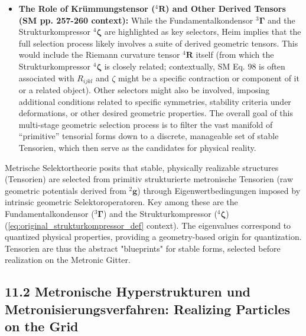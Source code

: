 \documentclass[12pt]{article}
\newcommand{\q}[1]{\enquote{#1}}
\newcommand{\kompositionsfeld}{{}^2\mathbf{g}}
\newcommand{\fundamentalkondensor}{{}^3\bm{\Gamma}}
\newcommand{\strukturkompressor}{{}^4\bm{\zeta}}
\begin{document}
\begin{itemize}
    \item \textbf{The Role of Krümmungstensor (\( {}^4\mathbf{R} \)) and Other Derived Tensors (SM pp. 257-260 context):}
    While the Fundamentalkondensor \( \fundamentalkondensor \) and the Strukturkompressor \( \strukturkompressor \) are highlighted as key selectors, Heim implies that the full selection process likely involves a suite of derived geometric tensors. This would include the Riemann curvature tensor \( {}^4\mathbf{R} \) itself (from which the Strukturkompressor \( \strukturkompressor \) is closely related; contextually, SM Eq. 98 is often associated with \(R_{ijkl}\) and \( \zeta \) might be a specific contraction or component of it or a related object). Other selectors might also be involved, imposing additional conditions related to specific symmetries, stability criteria under deformations, or other desired geometric properties. The overall goal of this multi-stage geometric selection process is to filter the vast manifold of \q{primitive} tensorial forms down to a discrete, manageable set of stable Tensorien, which then serve as the candidates for physical reality.
\end{itemize}

Metrische Selektortheorie posits that stable, physically realizable structures (Tensorien) are selected from primitiv strukturierte metronische Tensorien (raw geometric potentials derived from \(\kompositionsfeld\)) through Eigenwertbedingungen imposed by intrinsic geometric Selektoroperatoren. Key among these are the Fundamentalkondensor (\(\fundamentalkondensor\)) and the Strukturkompressor (\(\strukturkompressor\)) (\eqref{eq:original_strukturkompressor_def} context). The eigenvalues correspond to quantized physical properties, providing a geometry-based origin for quantization. Tensorien are thus the abstract "blueprints" for stable forms, selected before realization on the Metronic Gitter.

\subsection{11.2 Metronische Hyperstrukturen und Metronisierungsverfahren: Realizing Particles on the Grid}
\label{sec:hyperstrukturen}
\end{document}

